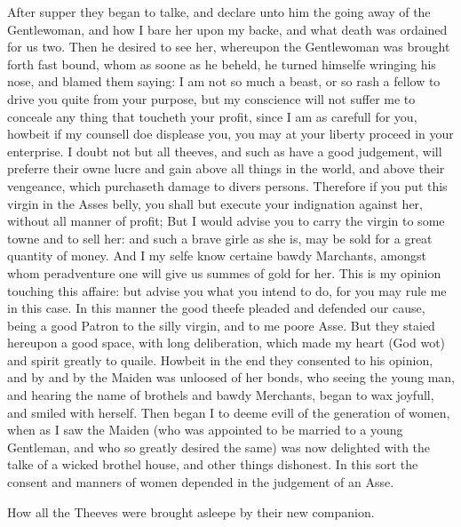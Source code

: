 After supper they began to talke, and declare unto him the going away of the
Gentlewoman, and how I bare her upon my backe, and what death was ordained for
us two. Then he desired to see her, whereupon the Gentlewoman was brought forth
fast bound, whom as soone as he beheld, he turned himselfe wringing his nose,
and blamed them saying: I am not so much a beast, or so rash a fellow to drive
you quite from your purpose, but my conscience will not suffer me to conceale
any thing that toucheth your profit, since I am as carefull for you, howbeit if
my counsell doe displease you, you may at your liberty proceed in your
enterprise. I doubt not but all theeves, and such as have a good judgement,
will preferre their owne lucre and gain above all things in the world, and
above their vengeance, which purchaseth damage to divers persons. Therefore if
you put this virgin in the Asses belly, you shall but execute your indignation
against her, without all manner of profit; But I would advise you to carry the
virgin to some towne and to sell her: and such a brave girle as she is, may be
sold for a great quantity of money. And I my selfe know certaine bawdy
Marchants, amongst whom peradventure one will give us summes of gold for her.
This is my opinion touching this affaire: but advise you what you intend to do,
for you may rule me in this case. In this manner the good theefe pleaded and
defended our cause, being a good Patron to the silly virgin, and to me poore
Asse. But they staied hereupon a good space, with long deliberation, which made
my heart (God wot) and spirit greatly to quaile. Howbeit in the end they
consented to his opinion, and by and by the Maiden was unloosed of her bonds,
who seeing the young man, and hearing the name of brothels and bawdy Merchants,
began to wax joyfull, and smiled with herself. Then began I to deeme evill of
the generation of women, when as I saw the Maiden (who was appointed to be
married to a young Gentleman, and who so greatly desired the same) was now
delighted with the talke of a wicked brothel house, and other things dishonest.
In this sort the consent and manners of women depended in the judgement of an
Asse.


How all the Theeves were brought asleepe by their new companion.

